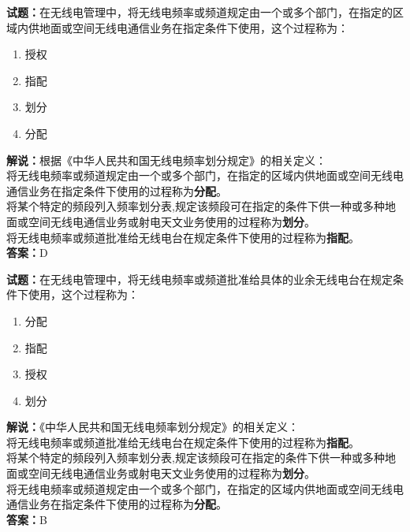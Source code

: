 \documentclass{ctexbook}
\begin{document}
\noindent\textbf{试题：}在无线电管理中，将无线电频率或频道规定由一个或多个部门，在指定的区域内供地面或空间无线电通信业务在指定条件下使用，这个过程称为：
\begin{enumerate}[leftmargin=3em]
  \item 授权
  \item 指配
  \item 划分
  \item 分配
\end{enumerate}
\noindent\textbf{解说：}根据《中华人民共和国无线电频率划分规定》的相关定义：\\将无线电频率或频道规定由一个或多个部门，在指定的区域内供地面或空间无线电通信业务在指定条件下使用的过程称为\textbf{分配}。\\将某个特定的频段列入频率划分表,规定该频段可在指定的条件下供一种或多种地面或空间无线电通信业务或射电天文业务使用的过程称为\textbf{划分}。\\将无线电频率或频道批准给无线电台在规定条件下使用的过程称为\textbf{指配}。\\
\textbf{答案：}D

\vspace{\baselineskip}

\noindent\textbf{试题：}在无线电管理中，将无线电频率或频道批准给具体的业余无线电台在规定条件下使用，这个过程称为：
\begin{enumerate}[leftmargin=3em]
  \item 分配
  \item 指配
  \item 授权
  \item 划分
\end{enumerate}
\noindent\textbf{解说：}《中华人民共和国无线电频率划分规定》的相关定义：\\将无线电频率或频道批准给无线电台在规定条件下使用的过程称为\textbf{指配}。\\将某个特定的频段列入频率划分表,规定该频段可在指定的条件下供一种或多种地面或空间无线电通信业务或射电天文业务使用的过程称为\textbf{划分}。\\将无线电频率或频道规定由一个或多个部门，在指定的区域内供地面或空间无线电通信业务在指定条件下使用的过程称为\textbf{分配}。\\
\textbf{答案：}B

\vspace{\baselineskip}
\end{document}
